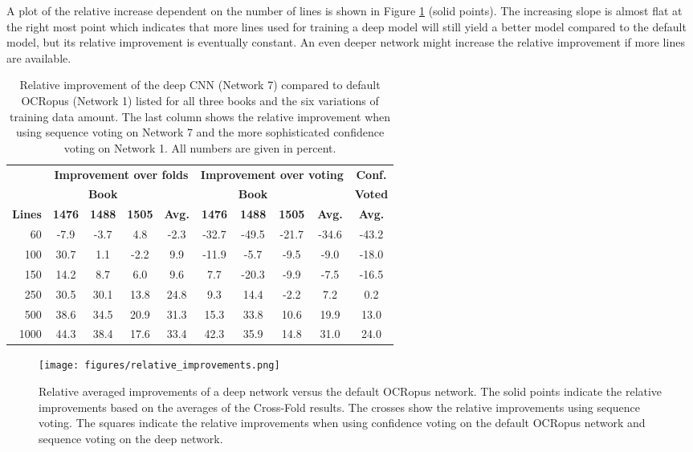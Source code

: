 \documentclass{jlcl}
\begin{document}
A plot of the relative increase dependent on the number of lines is shown in Figure \ref{fig:relative_improvements} (solid points).
The increasing slope is almost flat at the right most point which indicates that more lines used for training a deep model will still yield a better model compared to the default model, but its relative improvement is eventually constant.
An even deeper network might increase the relative improvement if more lines are available.

\begin{table}[t]
    \centering
    \caption{Relative improvement of the deep CNN (Network 7) compared to default OCRopus (Network 1) listed for all three books and the six variations of training data amount.
    The last column shows the relative improvement when using sequence voting on Network 7 and the more sophisticated confidence voting on Network 1.
    All numbers are given in percent.}
    \label{tab:improvements}
    \begin{tabular}{r|ccc|c|ccc|c||c}
        \hline
              & \multicolumn{4}{c|}{\textbf{Improvement over folds}} & \multicolumn{4}{c||}{\textbf{Improvement over voting}} & \textbf{Conf.} \\
              & \multicolumn{3}{c|}{\textbf{Book}} & & \multicolumn{3}{c|}{\textbf{Book}} & & \textbf{Voted} \\ 
        \textbf{Lines} & \textbf{1476} & \textbf{1488} & \textbf{1505} & \textbf{Avg.} & \textbf{1476} & \textbf{1488} & \textbf{1505} & \textbf{Avg.} & \textbf{Avg.} \\
        \hline
           60 & -7.9 & -3.7 &  4.8 & -2.3 & -32.7 & -49.5 & -21.7 & -34.6 & -43.2 \\
          100 & 30.7 & 1.1  & -2.2 &  9.9 & -11.9 &  -5.7 &  -9.5 &  -9.0 & -18.0 \\
          150 & 14.2 & 8.7  &  6.0 &  9.6 &   7.7 & -20.3 &  -9.9 &  -7.5 & -16.5 \\
          250 & 30.5 & 30.1 & 13.8 & 24.8 &   9.3 &  14.4 &  -2.2 &   7.2 &   0.2 \\
          500 & 38.6 & 34.5 & 20.9 & 31.3 &  15.3 &  33.8 &  10.6 &  19.9 &  13.0 \\
         1000 & 44.3 & 38.4 & 17.6 & 33.4 &  42.3 &  35.9 &  14.8 &  31.0 &  24.0 \\
         \hline
    \end{tabular}
\end{table}


\begin{figure}[t]
    \centering
    \texttt{[image: figures/relative\_improvements.png]}
    \caption{Relative averaged improvements of a deep network versus the default OCRopus network. The solid points indicate the relative improvements based on the averages of the Cross-Fold results.
    The crosses show the relative improvements using sequence voting.
    The squares indicate the relative improvements when using confidence voting on the default OCRopus network and sequence voting on the deep network.}
    \label{fig:relative_improvements}
\end{figure}
\end{document}
